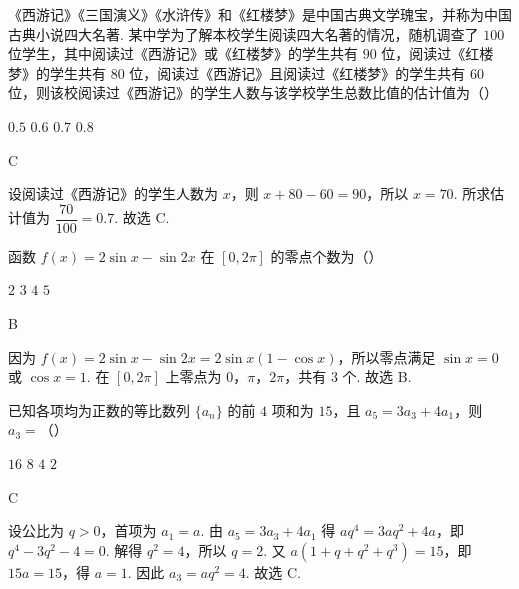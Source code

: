 \begin{problem}
《西游记》《三国演义》《水浒传》和《红楼梦》是中国古典文学瑰宝，并称为中国古典小说四大名著. 某中学为了解本校学生阅读四大名著的情况，随机调查了 \(100\) 位学生，其中阅读过《西游记》或《红楼梦》的学生共有 \(90\) 位，阅读过《红楼梦》的学生共有 \(80\) 位，阅读过《西游记》且阅读过《红楼梦》的学生共有 \(60\) 位，则该校阅读过《西游记》的学生人数与该学校学生总数比值的估计值为（\quad）

\choices
    {\(0.5\)}
    {\(0.6\)}
    {\(0.7\)}
    {\(0.8\)}
\end{problem}

\begin{answer}
C
\end{answer}

\begin{solution}
设阅读过《西游记》的学生人数为 \(x\)，则 \(x+80-60=90\)，所以 \(x=70\). 所求估计值为 \(\dfrac{70}{100}=0.7\). 故选 C.
\end{solution}

\begin{problem}
函数 \(f(x)=2\sin x-\sin2x\) 在 \([0,2\pi]\) 的零点个数为（\quad）

\choices
    {\(2\)}
    {\(3\)}
    {\(4\)}
    {\(5\)}
\end{problem}

\begin{answer}
B
\end{answer}

\begin{solution}
因为 \(f(x)=2\sin x-\sin2x=2\sin x(1-\cos x)\)，所以零点满足 \(\sin x=0\) 或 \(\cos x=1\). 在 \([0,2\pi]\) 上零点为 \(0\)，\(\pi\)，\(2\pi\)，共有 \(3\) 个. 故选 B.
\end{solution}

\begin{problem}
已知各项均为正数的等比数列 \(\{a_n\}\) 的前 \(4\) 项和为 \(15\)，且 \(a_5=3a_3+4a_1\)，则 \(a_3=\)（\quad）

\choices
    {\(16\)}
    {\(8\)}
    {\(4\)}
    {\(2\)}
\end{problem}

\begin{answer}
C
\end{answer}

\begin{solution}
设公比为 \(q>0\)，首项为 \(a_1=a\). 由 \(a_5=3a_3+4a_1\) 得 \(aq^4=3aq^2+4a\)，即 \(q^4-3q^2-4=0\). 解得 \(q^2=4\)，所以 \(q=2\). 又 \(a(1+q+q^2+q^3)=15\)，即 \(15a=15\)，得 \(a=1\). 因此 \(a_3=aq^2=4\). 故选 C.
\end{solution}

